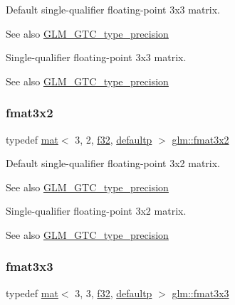 Default single-\/qualifier floating-\/point 3x3 matrix. \begin{DoxySeeAlso}{See also}
\mbox{\hyperlink{group__gtc__type__precision}{G\+L\+M\+\_\+\+G\+T\+C\+\_\+type\+\_\+precision}}
\end{DoxySeeAlso}
Single-\/qualifier floating-\/point 3x3 matrix. \begin{DoxySeeAlso}{See also}
\mbox{\hyperlink{group__gtc__type__precision}{G\+L\+M\+\_\+\+G\+T\+C\+\_\+type\+\_\+precision}} 
\end{DoxySeeAlso}
\mbox{\label{group__gtc__type__precision_gaed9c8fe9d2e094bf3bc7c606bbae1a6b}} 
\subsubsection{\texorpdfstring{fmat3x2}{fmat3x2}}
{\footnotesize\ttfamily typedef \mbox{\hyperlink{structglm_1_1mat}{mat}}$<$ 3, 2, \mbox{\hyperlink{group__gtc__type__precision_ga0ec999b57f5330d9021256e96038df04}{f32}}, \mbox{\hyperlink{namespaceglm_a36ed105b07c7746804d7fdc7cc90ff25a9d21ccd8b5a009ec7eb7677befc3bf51}{defaultp}} $>$ \mbox{\hyperlink{group__gtc__type__precision_gaed9c8fe9d2e094bf3bc7c606bbae1a6b}{glm\+::fmat3x2}}}

Default single-\/qualifier floating-\/point 3x2 matrix. \begin{DoxySeeAlso}{See also}
\mbox{\hyperlink{group__gtc__type__precision}{G\+L\+M\+\_\+\+G\+T\+C\+\_\+type\+\_\+precision}}
\end{DoxySeeAlso}
Single-\/qualifier floating-\/point 3x2 matrix. \begin{DoxySeeAlso}{See also}
\mbox{\hyperlink{group__gtc__type__precision}{G\+L\+M\+\_\+\+G\+T\+C\+\_\+type\+\_\+precision}} 
\end{DoxySeeAlso}
\mbox{\label{group__gtc__type__precision_ga5bf6f06e3cac1ed82489f858a0816aaa}} 
\subsubsection{\texorpdfstring{fmat3x3}{fmat3x3}}
{\footnotesize\ttfamily typedef \mbox{\hyperlink{structglm_1_1mat}{mat}}$<$ 3, 3, \mbox{\hyperlink{group__gtc__type__precision_ga0ec999b57f5330d9021256e96038df04}{f32}}, \mbox{\hyperlink{namespaceglm_a36ed105b07c7746804d7fdc7cc90ff25a9d21ccd8b5a009ec7eb7677befc3bf51}{defaultp}} $>$ \mbox{\hyperlink{group__gtc__type__precision_ga5bf6f06e3cac1ed82489f858a0816aaa}{glm\+::fmat3x3}}}

